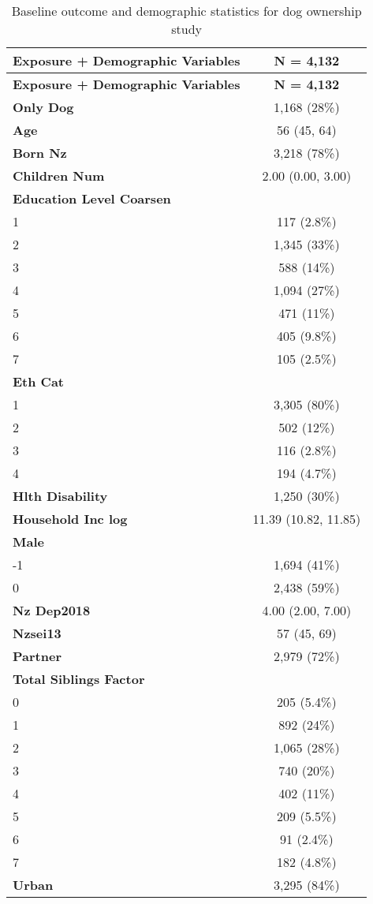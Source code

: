 \documentclass[
  singlecolumn,
  9pt]{article}
\begin{document}
\begin{longtable}[]{@{}lc@{}}
\caption{Baseline outcome and demographic statistics for dog ownership
study}\label{tbl-table_demographic_vars_dogs-m}\tabularnewline
\toprule\noalign{}
\textbf{Exposure + Demographic Variables} & \textbf{N = 4,132} \\
\midrule\noalign{}
\endfirsthead
\toprule\noalign{}
\textbf{Exposure + Demographic Variables} & \textbf{N = 4,132} \\
\midrule\noalign{}
\endhead
\bottomrule\noalign{}
\endlastfoot
\textbf{Only Dog} & 1,168 (28\%) \\
\textbf{Age} & 56 (45, 64) \\
\textbf{Born Nz} & 3,218 (78\%) \\
\textbf{Children Num} & 2.00 (0.00, 3.00) \\
\textbf{Education Level Coarsen} & \\
1 & 117 (2.8\%) \\
2 & 1,345 (33\%) \\
3 & 588 (14\%) \\
4 & 1,094 (27\%) \\
5 & 471 (11\%) \\
6 & 405 (9.8\%) \\
7 & 105 (2.5\%) \\
\textbf{Eth Cat} & \\
1 & 3,305 (80\%) \\
2 & 502 (12\%) \\
3 & 116 (2.8\%) \\
4 & 194 (4.7\%) \\
\textbf{Hlth Disability} & 1,250 (30\%) \\
\textbf{Household Inc log} & 11.39 (10.82, 11.85) \\
\textbf{Male} & \\
-1 & 1,694 (41\%) \\
0 & 2,438 (59\%) \\
\textbf{Nz Dep2018} & 4.00 (2.00, 7.00) \\
\textbf{Nzsei13} & 57 (45, 69) \\
\textbf{Partner} & 2,979 (72\%) \\
\textbf{Total Siblings Factor} & \\
0 & 205 (5.4\%) \\
1 & 892 (24\%) \\
2 & 1,065 (28\%) \\
3 & 740 (20\%) \\
4 & 402 (11\%) \\
5 & 209 (5.5\%) \\
6 & 91 (2.4\%) \\
7 & 182 (4.8\%) \\
\textbf{Urban} & 3,295 (84\%) \\
\end{longtable}
\end{document}
